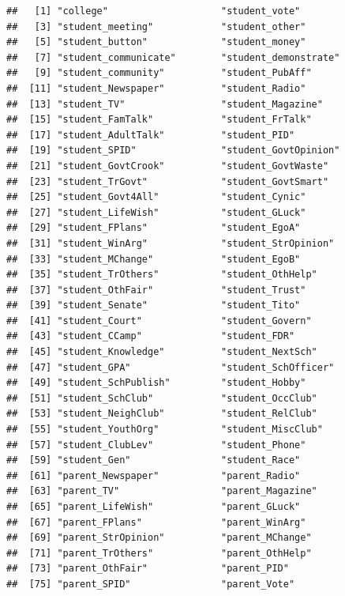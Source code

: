 \documentclass[
]{article}
\begin{document}
\begin{verbatim}
##   [1] "college"                    "student_vote"              
##   [3] "student_meeting"            "student_other"             
##   [5] "student_button"             "student_money"             
##   [7] "student_communicate"        "student_demonstrate"       
##   [9] "student_community"          "student_PubAff"            
##  [11] "student_Newspaper"          "student_Radio"             
##  [13] "student_TV"                 "student_Magazine"          
##  [15] "student_FamTalk"            "student_FrTalk"            
##  [17] "student_AdultTalk"          "student_PID"               
##  [19] "student_SPID"               "student_GovtOpinion"       
##  [21] "student_GovtCrook"          "student_GovtWaste"         
##  [23] "student_TrGovt"             "student_GovtSmart"         
##  [25] "student_Govt4All"           "student_Cynic"             
##  [27] "student_LifeWish"           "student_GLuck"             
##  [29] "student_FPlans"             "student_EgoA"              
##  [31] "student_WinArg"             "student_StrOpinion"        
##  [33] "student_MChange"            "student_EgoB"              
##  [35] "student_TrOthers"           "student_OthHelp"           
##  [37] "student_OthFair"            "student_Trust"             
##  [39] "student_Senate"             "student_Tito"              
##  [41] "student_Court"              "student_Govern"            
##  [43] "student_CCamp"              "student_FDR"               
##  [45] "student_Knowledge"          "student_NextSch"           
##  [47] "student_GPA"                "student_SchOfficer"        
##  [49] "student_SchPublish"         "student_Hobby"             
##  [51] "student_SchClub"            "student_OccClub"           
##  [53] "student_NeighClub"          "student_RelClub"           
##  [55] "student_YouthOrg"           "student_MiscClub"          
##  [57] "student_ClubLev"            "student_Phone"             
##  [59] "student_Gen"                "student_Race"              
##  [61] "parent_Newspaper"           "parent_Radio"              
##  [63] "parent_TV"                  "parent_Magazine"           
##  [65] "parent_LifeWish"            "parent_GLuck"              
##  [67] "parent_FPlans"              "parent_WinArg"             
##  [69] "parent_StrOpinion"          "parent_MChange"            
##  [71] "parent_TrOthers"            "parent_OthHelp"            
##  [73] "parent_OthFair"             "parent_PID"                
##  [75] "parent_SPID"                "parent_Vote"               

\end{verbatim}
\end{document}
